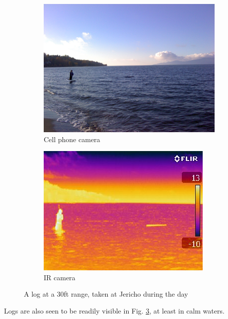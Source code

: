 \begin{figure}[H]
\centering
\begin{subfigure}{.5\textwidth}
  \centering
  \includegraphics[width=.8\linewidth]{"./image/jericho-day-log-visible"}
  \caption{Cell phone camera}
  \label{fig:sub1}
\end{subfigure}%
\begin{subfigure}{.5\textwidth}
  \centering
  \includegraphics[width=.8\linewidth]{"./image/jericho-day-log-ir"}
  \caption{IR camera}
  \label{fig:sub2}
\end{subfigure}
\caption{A log at a 30ft range, taken at Jericho during the day}
\label{fig:IR comparison of a log during the day}
\end{figure}

Logs are also seen to be readily visible in Fig. \ref{fig:IR comparison of a log during the day}, at least in calm waters.


